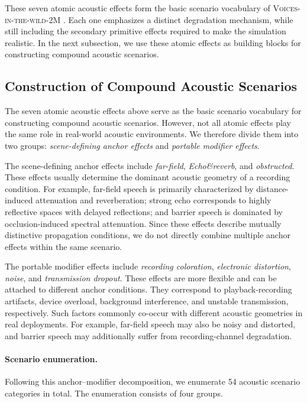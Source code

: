 \documentclass{article}
\begin{document}
These seven atomic acoustic effects form the basic scenario vocabulary of
 \textsc{Voices-in-the-wild-2M} . Each one emphasizes a distinct degradation mechanism,
while still including the secondary primitive effects required to make the
simulation realistic. In the next subsection, we use these atomic effects as
building blocks for constructing compound acoustic scenarios.

\subsection{Construction of Compound Acoustic Scenarios}

The seven atomic acoustic effects above serve as the basic scenario vocabulary
for constructing compound acoustic scenarios. However, not all atomic effects
play the same role in real-world acoustic environments. We therefore divide
them into two groups: \textit{scene-defining anchor effects} and
\textit{portable modifier effects}.

The scene-defining anchor effects include \textit{far-field},
\textit{Echo\&reverb}, and \textit{obstructed}. These effects usually determine the
dominant acoustic geometry of a recording condition. For example, far-field
speech is primarily characterized by distance-induced attenuation and
reverberation; strong echo corresponds to highly reflective spaces with delayed
reflections; and barrier speech is dominated by occlusion-induced spectral
attenuation. Since these effects describe mutually distinctive propagation
conditions, we do not directly combine multiple anchor effects within the same
scenario.

The portable modifier effects include \textit{recording coloration},
\textit{electronic distortion}, \textit{noise}, and \textit{transmission
dropout}. These effects are more flexible and can be attached to different
anchor conditions. They correspond to playback-recording artifacts, device
overload, background interference, and unstable transmission, respectively.
Such factors commonly co-occur with different acoustic geometries in real
deployments. For example, far-field speech may also be noisy and distorted, and
barrier speech may additionally suffer from recording-channel degradation.

\paragraph{Scenario enumeration.}
Following this anchor--modifier decomposition, we enumerate 54 acoustic
scenario categories in total. The enumeration consists of four groups.
\end{document}
